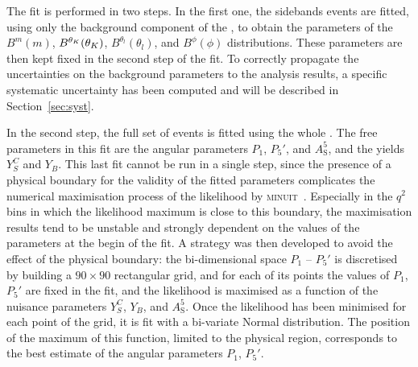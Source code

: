 
The fit is performed in two steps.
In the first one, the sidebands events are fitted, using only the background component of the \pdf, to obtain the parameters of the $B^m(m)$, $B^{\theta_K}(\theta_K)$, $B^{\theta_l}(\theta_l)$, and $B^{\phi}(\phi)$ distributions.
These parameters are then kept fixed in the second step of the fit.
To correctly propagate the uncertainties on the background parameters to the analysis results, a specific systematic uncertainty has been computed and will be described in Section~\ref{sec:syst}.

In the second step, the full set of events is fitted using the whole \pdf.
The free parameters in this fit are the angular parameters $P_1$, $P_5'$, and $A^5_\mathrm{S}$, and the yields $Y^{C}_{S}$ and $Y_{B}$.
This last fit cannot be run in a single step, since the presence of a physical boundary for the validity of the fitted parameters complicates the numerical maximisation process of the likelihood by \textsc{minuit}~\cite{Minuit}.
Especially in the $q^2$ bins in which the likelihood maximum is close to this boundary, the maximisation results tend to be unstable and strongly dependent on the values of the parameters at the begin of the fit.
A strategy was then developed to avoid the effect of the physical boundary: the bi-dimensional space $P_1$ -- $P_5'$ is discretised by building a $90\times90$ rectangular grid, and for each of its points the values of $P_1$, $P_5'$ are fixed in the fit, and the likelihood is maximised as a function of the nuisance parameters $Y^{C}_{S}$, $Y_{B}$, and $A^5_\mathrm{S}$.
Once the likelihood has been minimised for each point of the grid, it is fit with a bi-variate Normal distribution.
The position of the maximum of this function, limited to the physical region, corresponds to the best estimate of the angular parameters $P_1$, $P_5'$.
